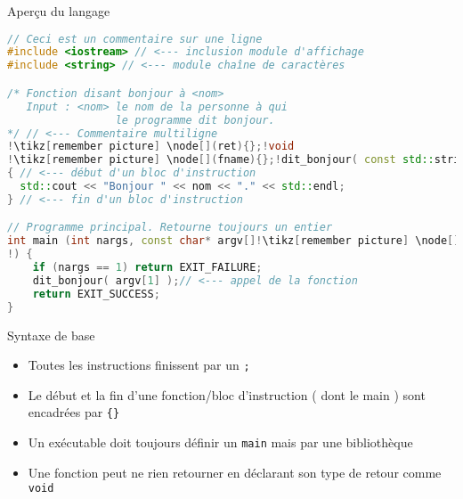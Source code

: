 \documentclass[handout,10pt]{beamer}
\newcommand{\includecode}[2][cpp]{

}
\begin{document}
\begin{frame}[fragile]{Aperçu du langage}
\tiny
\hfill\begin{minipage}{0.66\linewidth}
\begin{lstlisting}[escapechar=!, language=C++,linewidth=0.9\linewidth]
// Ceci est un commentaire sur une ligne
#include <iostream> // <--- inclusion module d'affichage
#include <string> // <--- module chaîne de caractères 

/* Fonction disant bonjour à <nom>
   Input : <nom> le nom de la personne à qui
                 le programme dit bonjour.
*/ // <--- Commentaire multiligne
!\tikz[remember picture] \node[](ret){};!void
!\tikz[remember picture] \node[](fname){};!dit_bonjour( const std::string& nom!\tikz[remember picture] \node[](args) {};! )
{ // <--- début d'un bloc d'instruction
  std::cout << "Bonjour " << nom << "." << std::endl;
} // <--- fin d'un bloc d'instruction

// Programme principal. Retourne toujours un entier
int main (int nargs, const char* argv[]!\tikz[remember picture] \node[](margs){};
!) {
    if (nargs == 1) return EXIT_FAILURE;
    dit_bonjour( argv[1] );// <--- appel de la fonction
    return EXIT_SUCCESS;
}
\end{lstlisting}
\end{minipage}

\begin{block}{Syntaxe de base}
\begin{itemize}
 \item Toutes les instructions finissent par un \lstinline$;$
 \item Le début et la fin d'une fonction/bloc d'instruction ( dont le main ) sont encadrées par \lstinline${}$
 \item Un exécutable doit toujours définir un \lstinline$main$ mais par une bibliothèque
 \item Une fonction peut ne rien retourner en déclarant son type de retour comme \lstinline$void$
\end{itemize}
\end{block}


\end{frame}
\end{document}
